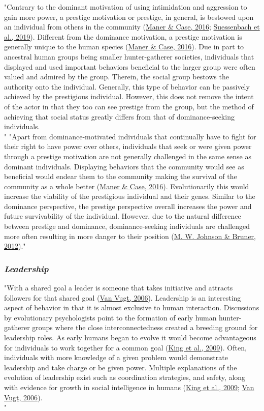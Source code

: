 \documentclass[
"  donotrepeattitle,doc, 12pt, a4paper,floatsintext]{apa7}"
\begin{document}
"Contrary to the dominant motivation of using intimidation and aggression to gain more power, a prestige motivation or prestige, in general, is bestowed upon an individual from others in the community (\protect\hyperlink{ref-maner2016}{Maner \& Case, 2016}; \protect\hyperlink{ref-suessenbach2019}{Suessenbach et al., 2019}). Different from the dominance motivation, a prestige motivation is generally unique to the human species (\protect\hyperlink{ref-maner2016}{Maner \& Case, 2016}). Due in part to ancestral human groups being smaller hunter-gatherer societies, individuals that displayed and used important behaviors beneficial to the larger group were often valued and admired by the group. Therein, the social group bestows the authority onto the individual. Generally, this type of behavior can be passively achieved by the prestigious individual. However, this does not remove the intent of the actor in that they too can see prestige from the group, but the method of achieving that social status greatly differs from that of dominance-seeking individuals.\\"
"Apart from dominance-motivated individuals that continually have to fight for their right to have power over others, individuals that seek or were given power through a prestige motivation are not generally challenged in the same sense as dominant individuals. Displaying behaviors that the community would see as beneficial would endear them to the community making the survival of the community as a whole better (\protect\hyperlink{ref-maner2016}{Maner \& Case, 2016}). Evolutionarily this would increase the viability of the prestigious individual and their genes. Similar to the dominance perspective, the prestige perspective overall increases the power and future survivability of the individual. However, due to the natural difference between prestige and dominance, dominance-seeking individuals are challenged more often resulting in more danger to their position (\protect\hyperlink{ref-johnson2012}{M. W. Johnson \& Bruner, 2012})."
\hypertarget{leadership}{%
\subsubsection{\texorpdfstring{\emph{Leadership}}{Leadership}}\label{leadership}}
"With a shared goal a leader is someone that takes initiative and attracts followers for that shared goal (\protect\hyperlink{ref-vanvugt2006}{Van Vugt, 2006}). Leadership is an interesting aspect of behavior in that it is almost exclusive to human interaction. Discussions by evolutionary psychologists point to the formation of early human hunter-gatherer groups where the close interconnectedness created a breeding ground for leadership roles. As early humans began to evolve it would become advantageous for individuals to work together for a common goal (\protect\hyperlink{ref-king2009}{King et al., 2009}). Often, individuals with more knowledge of a given problem would demonstrate leadership and take charge or be given power. Multiple explanations of the evolution of leadership exist such as coordination strategies, and safety, along with evidence for growth in social intelligence in humans (\protect\hyperlink{ref-king2009}{King et al., 2009}; \protect\hyperlink{ref-vanvugt2006}{Van Vugt, 2006}).\\"
\end{document}
